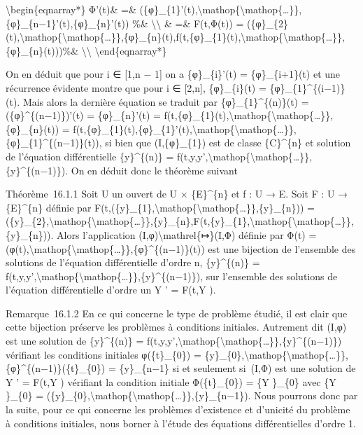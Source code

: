 \documentclass[]{article}
\begin{document}
\textbackslash{}begin\{eqnarray*\} Φ'(t)\& =\&
(\{φ\}\_\{1\}'(t),\textbackslash{}mathop\{\textbackslash{}mathop\{\ldots{}\}\},\{φ\}\_\{n−1\}'(t),\{φ\}\_\{n\}'(t))
\%\& \textbackslash{}\textbackslash{} \& =\& F(t,Φ(t)) =
(\{φ\}\_\{2\}(t),\textbackslash{}mathop\{\textbackslash{}mathop\{\ldots{}\}\},\{φ\}\_\{n\}(t),f(t,\{φ\}\_\{1\}(t),\textbackslash{}mathop\{\textbackslash{}mathop\{\ldots{}\}\},\{φ\}\_\{n\}(t)))\%\&
\textbackslash{}\textbackslash{} \textbackslash{}end\{eqnarray*\}

On en déduit que pour i ∈ {[}1,n − 1{]} on a \{φ\}\_\{i\}'(t) =
\{φ\}\_\{i+1\}(t) et une récurrence évidente montre que pour i ∈
{[}2,n{]}, \{φ\}\_\{i\}(t) = \{φ\}\_\{1\}\^{}\{(i−1)\}(t). Mais alors la
dernière équation se traduit par \{φ\}\_\{1\}\^{}\{(n)\}(t) =
(\{φ\}\^{}\{(n−1)\})'(t) = \{φ\}\_\{n\}'(t) =
f(t,\{φ\}\_\{1\}(t),\textbackslash{}mathop\{\textbackslash{}mathop\{\ldots{}\}\},\{φ\}\_\{n\}(t))
=
f(t,\{φ\}\_\{1\}(t),\{φ\}\_\{1\}'(t),\textbackslash{}mathop\{\textbackslash{}mathop\{\ldots{}\}\},\{φ\}\_\{1\}\^{}\{(n−1)\}(t)),
si bien que (I,\{φ\}\_\{1\}) est de classe \{C\}\^{}\{n\} et solution de
l'équation différentielle \{y\}\^{}\{(n)\} =
f(t,y,y',\textbackslash{}mathop\{\textbackslash{}mathop\{\ldots{}\}\},\{y\}\^{}\{(n−1)\}).
On en déduit donc le théorème suivant

Théorème~16.1.1 Soit U un ouvert de U × \{E\}\^{}\{n\} et f : U → E.
Soit F : U → \{E\}\^{}\{n\} définie par
F(t,(\{y\}\_\{1\},\textbackslash{}mathop\{\textbackslash{}mathop\{\ldots{}\}\},\{y\}\_\{n\}))
=
(\{y\}\_\{2\},\textbackslash{}mathop\{\textbackslash{}mathop\{\ldots{}\}\},\{y\}\_\{n\},F(t,\{y\}\_\{1\},\textbackslash{}mathop\{\textbackslash{}mathop\{\ldots{}\}\},\{y\}\_\{n\})).
Alors l'application (I,φ)\textbackslash{}mathrel\{↦\}(I,Φ) définie par
Φ(t) =
(φ(t),\textbackslash{}mathop\{\textbackslash{}mathop\{\ldots{}\}\},\{φ\}\^{}\{(n−1)\}(t))
est une bijection de l'ensemble des solutions de l'équation
différentielle d'ordre n, \{y\}\^{}\{(n)\} =
f(t,y,y',\textbackslash{}mathop\{\textbackslash{}mathop\{\ldots{}\}\},\{y\}\^{}\{(n−1)\}),
sur l'ensemble des solutions de l'équation différentielle d'ordre un Y '
= F(t,Y ).

Remarque~16.1.2 En ce qui concerne le type de problème étudié, il est
clair que cette bijection préserve les problèmes à conditions initiales.
Autrement dit (I,φ) est une solution de \{y\}\^{}\{(n)\} =
f(t,y,y',\textbackslash{}mathop\{\textbackslash{}mathop\{\ldots{}\}\},\{y\}\^{}\{(n−1)\})
vérifiant les conditions initiales φ(\{t\}\_\{0\}) =
\{y\}\_\{0\},\textbackslash{}mathop\{\textbackslash{}mathop\{\ldots{}\}\},\{φ\}\^{}\{(n−1)\}(\{t\}\_\{0\})
= \{y\}\_\{n−1\} si et seulement si~(I,Φ) est une solution de Y ' =
F(t,Y ) vérifiant la condition initiale Φ(\{t\}\_\{0\}) = \{Y \}\_\{0\}
avec \{Y \}\_\{0\} =
(\{y\}\_\{0\},\textbackslash{}mathop\{\textbackslash{}mathop\{\ldots{}\}\},\{y\}\_\{n−1\}).
Nous pourrons donc par la suite, pour ce qui concerne les problèmes
d'existence et d'unicité du problème à conditions initiales, nous borner
à l'étude des équations différentielles d'ordre 1.
\end{document}
